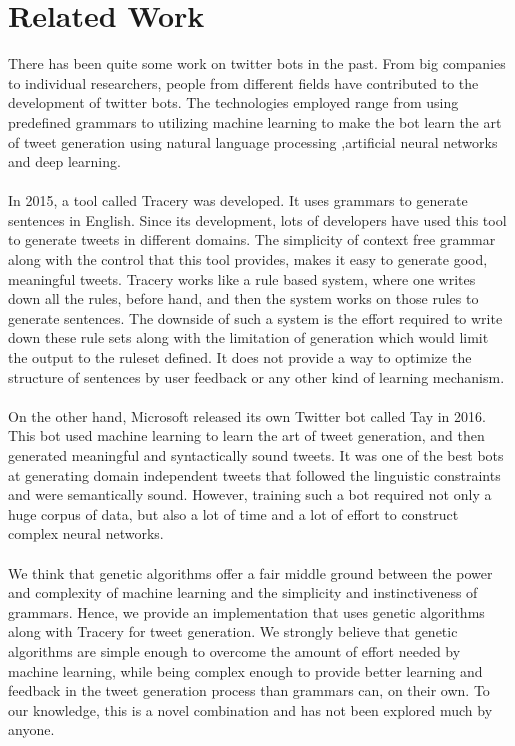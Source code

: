 \section{Related Work}
There has been quite some work on twitter bots in the past. From big companies to individual researchers, people from different fields have contributed to the development of twitter bots. The technologies employed range from using predefined grammars to utilizing machine learning to make the bot learn the art of tweet generation using natural language processing ,artificial neural networks and deep learning.

\paragraph{}
In 2015, a tool called Tracery\cite{tracery} was developed. It uses grammars to generate sentences in English. Since its development, lots of developers have used this tool to generate tweets in different domains. The simplicity of context free grammar along with the control that this tool provides, makes it easy to generate good, meaningful tweets. Tracery works like a rule based system, where one writes down all the rules, before hand, and then the system works on those rules to generate sentences. The downside of such a system is the effort required to write down these rule sets along with the limitation of generation which would limit the output to the ruleset defined. It does not provide a way to optimize the structure of sentences by user feedback or any other kind of learning mechanism.

\paragraph{}
On the other hand, Microsoft released its own Twitter bot called Tay in 2016. This bot used machine learning to learn the art of tweet generation, and then generated meaningful and syntactically sound tweets. It was one of the best bots at generating domain independent tweets that followed the linguistic constraints and were semantically sound. However, training such a bot required not only a huge corpus of data, but also a lot of time and a lot of effort to construct complex neural networks.

\paragraph{}
We think that genetic algorithms offer a fair middle ground between the power and complexity of machine learning and the simplicity and instinctiveness of grammars. Hence, we provide an implementation that uses genetic algorithms along with Tracery for tweet generation. We strongly believe that genetic algorithms are simple enough to overcome the amount of effort needed by machine learning, while being complex enough to provide better learning and feedback in the tweet generation process than grammars can, on their own. To our knowledge, this is a novel combination and has not been explored much by anyone.